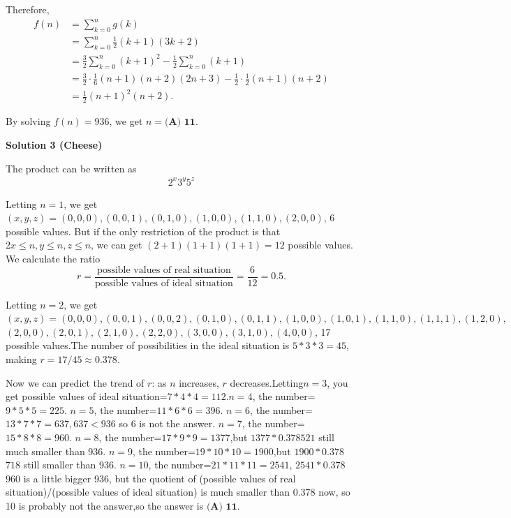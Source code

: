 \begin{enumerate}
 Therefore, 
 \begin{align*} f \left( n \right) & = \sum_{k = 0}^n g \left( k \right)  \\ & = \sum_{k=0}^n \frac{1}{2} \left( k + 1 \right) \left( 3 k + 2 \right) \\ & = \frac{3}{2} \sum_{k=0}^n \left( k + 1 \right)^2 - \frac{1}{2} \sum_{k=0}^n \left( k + 1 \right) \\ & = \frac{3}{2} \cdot \frac{1}{6} \left( n+1 \right) \left( n+2 \right) \left( 2n + 3 \right) - \frac{1}{2} \cdot \frac{1}{2} \left( n + 1 \right) \left( n + 2 \right) \\ & = \frac{1}{2} \left( n + 1 \right)^2 \left( n + 2 \right) . \end{align*}


 By solving $f \left( n \right) = 936$, we get $n = \boxed{\textbf{(A) 11}}$.

 



\textbf{Solution 3 (Cheese)}

The product can be written as
 \begin{align*} 2^x 3^y 5^z \end{align*}


 Letting $n=1$, we get $(x,y,z)=(0,0,0),(0,0,1),(0,1,0),(1,0,0),(1,1,0),(2,0,0)$, 6 possible values. But if the only restriction of the product is that $2x\le n,y\le n,z\le n$, we can get $(2+1)(1+1)(1+1)=12$ possible values. We calculate the ratio
 \[r = \frac{\text{possible values of real situation}}{\text{possible values of ideal situation}} = \frac{6}{12}=0.5.\]

 Letting $n=2$, we get $(x,y,z)=(0,0,0),(0,0,1),(0,0,2),(0,1,0),(0,1,1),(1,0,0),(1,0,1),(1,1,0),(1,1,1),(1,2,0),$
$(2,0,0),(2,0,1),(2,1,0),(2,2,0),(3,0,0),(3,1,0),(4,0,0)$, 17 possible values.The number of possibilities in the ideal situation is $5*3*3=45$, making $r = 17/45 \approx 0.378$.

 Now we can predict the trend of $r$: as $n$ increases, $r$ decreases.Letting$n=3$, you get possible values of ideal situation=$7*4*4=112$.$n=4$, the number=$9*5*5=225$.
$n=5$, the number=$11*6*6=396$.
$n=6$, the number=$13*7*7=637,637<936$ so 6 is not the answer.
$n=7$, the number=$15*8*8=960$.
$n=8$, the number=$17*9*9=1377$,but $1377*0.378$\approx$521$ still much smaller than 936.
$n=9$, the number=$19*10*10=1900$,but $1900*0.378$\approx$718$ still smaller than 936.
$n=10$, the number=$21*11*11=2541$, $2541*0.378$\approx$960$ is a little bigger 936, but the quotient of (possible values of real situation)/(possible values of ideal situation) is much smaller than 0.378 now, so 10 is probably not the answer,so the answer is $\boxed{\textbf{(A) 11}}$.


\end{enumerate}
